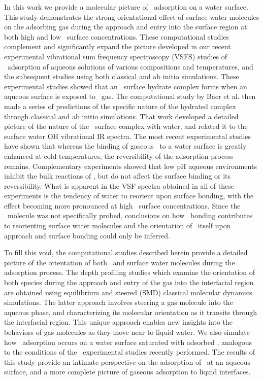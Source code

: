 In this work we provide a molecular picture of \suldiox~adsorption on a water surface.  This study demonstrates the strong orientational effect of surface water molecules on the adsorbing gas during the approach and entry into the surface region at both high and low \suldiox~surface concentrations.  These computational studies complement and significantly expand the picture developed in our recent experimental vibrational sum frequency spectroscopy (VSFS) studies of \suldiox~adsorption of aqueous solutions of various compositions and temperatures,\cite{Tarbuck2005,Tarbuck2006} and the subsequent studies using both classical and ab initio simulations.  These experimental studies showed that an \suldiox~surface hydrate complex forms when an aqueous surface is exposed to \suldiox~gas. The computational study by Baer et al.\cite{Baer2010} then made a series of predictions of the specific nature of the hydrated complex through classical and ab initio simulations. That work developed a detailed picture of the nature of the \suldiox~surface complex with water, and related it to the surface water OH vibrational IR spectra.  The most recent experimental studies have shown that whereas the binding of gaseous \suldiox~to a water surface is greatly enhanced at cold temperatures, the reversibility of the adsorption process remains.\cite{Ota2011}  Complementary experiments showed that low pH aqueous environments inhibit the bulk reactions of \suldiox, but do not affect the surface binding or its reversibility.  What is apparent in the VSF spectra obtained in all of these experiments is the tendency of water to reorient upon surface bonding, with the effect becoming more pronounced at high \suldiox~surface concentrations. Since the \suldiox~molecule was not specifically probed, conclusions on how \suldiox~bonding contributes to reorienting surface water molecules and the orientation of \suldiox~itself upon approach and surface bonding could only be inferred. 

To fill this void, the computational studies described herein provide a detailed picture of the orientation of both \suldiox~and surface water molecules during the adsorption process.  The depth profiling studies which examine the orientation of both species during the approach and entry of the gas into the interfacial region are obtained using equilibrium and steered (SMD) classical molecular dynamics simulations. The latter approach involves steering a gas molecule into the aqueous phase, and characterizing its molecular orientation as it transits through the interfacial region.  This unique approach enables new insights into the behaviors of gas molecules as they move near to liquid water. We also simulate how \suldiox~adsorption occurs on a water surface saturated with adsorbed \suldiox, analogous to the conditions of the \suldiox~experimental studies recently performed.\cite{Ota2011} The results of this study provide an intimate perspective on the adsorption of \suldiox~at an aqueous surface, and a more complete picture of gaseous adsorption to liquid interfaces.
